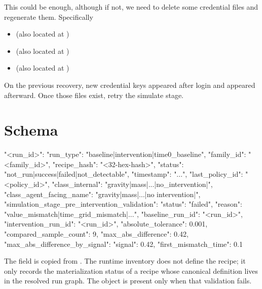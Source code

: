 \documentclass[11pt]{article}
\begin{document}
This could be enough, although if not, we need to delete some credential files and regenerate them. 
Specifically


\begin{itemize}
\item {} (also located at )
\item {} (also located at )
\item {} (also located at )
\end{itemize}

On the previous recovery, new credential keys appeared after login and  appeared afterward.
Once those files exist, retry the simulate stage.

\label{sec:simulation-model-record-schema}
\section*{ Schema}

\begin{DocCode}
{
  "<run_id>": {
    "run_type": "baseline|intervention|time0_baseline",
    "family_id": "<family_id>",
    "recipe_hash": "<32-hex-hash>",
    "status": "not_run|success|failed|not_detectable",
    "timestamp": "...",
    "last_policy_id": "<policy_id>",
    "class_internal": "gravity|mass|...|no_intervention|",
    "class_agent_facing_name": "gravity|mass|...|no intervention|",
    "simulation_stage_pre_intervention_validation": {
      "status": "failed",
      "reason": "value_mismatch|time_grid_mismatch|...",
      "baseline_run_id": "<run_id>",
      "intervention_run_id": "<run_id>",
      "absolute_tolerance": 0.001,
      "compared_sample_count": 9,
      "max_abs_difference": 0.42,
      "max_abs_difference_by_signal": {"signal": 0.42},
      "first_mismatch_time": 0.1
    }
  }
}
\end{DocCode}

The  field is copied from .
The runtime inventory does not define the recipe; it only records the materialization status of a recipe whose canonical definition lives in the resolved run graph.
The  object is present only when that validation fails.
\end{document}
